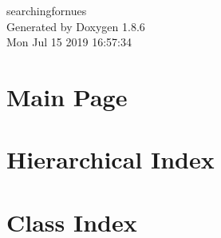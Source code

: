 \documentclass[twoside]{book}
\newcommand{\clearemptydoublepage}{%
  \newpage{\pagestyle{empty}\cleardoublepage}%
}
\begin{document}
\hypersetup{pageanchor=false}
\begin{titlepage}
\vspace*{7cm}
\begin{center}%
{\Large searchingfornues }\\
\vspace*{1cm}
{\large Generated by Doxygen 1.8.6}\\
\vspace*{0.5cm}
{\small Mon Jul 15 2019 16:57:34}\\
\end{center}
\end{titlepage}
\clearemptydoublepage
\tableofcontents
\clearemptydoublepage
{}
\hypersetup{pageanchor=true}

\chapter{Main Page}
\label{index}\hypertarget{index}{}
\chapter{Hierarchical Index}

\chapter{Class Index}

\end{document}
